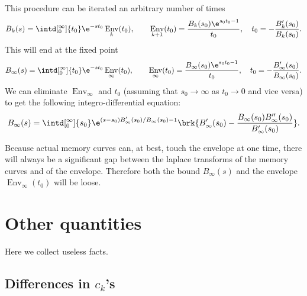 \documentclass[12pt]{article}
\DeclareMathOperator{\env}{Env}
\begin{document}
This procedure can be iterated an arbitrary number of times
%
\begin{equation}\label{eq:bootiter}
  B_k(s) = \intd[_0^\infty]{t_0} \e^{-st_0}\env_k(t_0),
  \qquad
  \env_{k+1}(t_0)=\frac{B_k(s_0) \e^{s_0t_0-1}}{t_0},
  \quad t_0 = -\frac{B_k'(s_0)}{B_k(s_0)}.
\end{equation}
%
This will end at the fixed point
%
\begin{equation}\label{eq:bootfixedpt}
  B_\infty(s) = \intd[_0^\infty]{t_0} \e^{-st_0}\env_\infty(t_0),
  \qquad
  \env_\infty(t_0)=\frac{B_\infty(s_0) \e^{s_0t_0-1}}{t_0},
  \quad t_0 = -\frac{B_\infty'(s_0)}{B_\infty(s_0)}.
\end{equation}
%
We can eliminate $\env_\infty$ and $t_0$ (assuming that $s_0\to \infty$ as $t_0 \to 0$ and vice versa) to get the following integro-differential equation:
%
\begin{equation}\label{eq:bootbnd}
  B_\infty(s) = \intd[_0^\infty]{s_0} \e^{(s-s_0)B'_\infty(s_0)/B_\infty(s_0)-1}
      \brk{B'_\infty(s_0)-\frac{B_\infty(s_0)B''_\infty(s_0)}{B'_\infty(s_0)}}.
\end{equation}
%

Because actual memory curves can, at best, touch the envelope at one time, there will always be a significant gap between the laplace transforms of the memory curves and of the envelope.
Therefore both the bound $B_\infty(s)$ and the envelope $\env_\infty(t_0)$ will be loose.



\appendix
\section{Other quantities}

Here we collect useless facts.

\subsection{Differences in \texorpdfstring{$c_k$}{c(k)}'s}\label{sec:areacoeffdiff}
\end{document}
